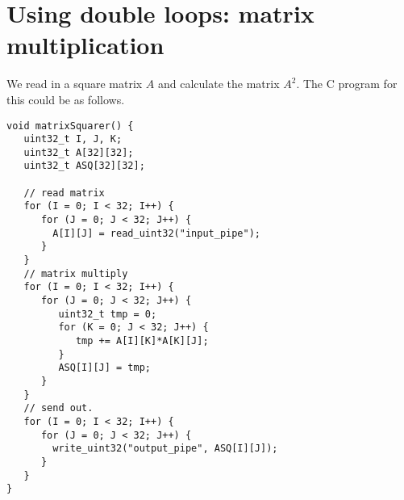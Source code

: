 \documentclass[12pt]{article}
\begin{document}
\section{Using double loops: matrix multiplication}

We read in a square matrix $A$ and calculate the 
matrix $A^2$.  The C program for this could be as follows.
\begin{verbatim}
void matrixSquarer() {
   uint32_t I, J, K;
   uint32_t A[32][32];
   uint32_t ASQ[32][32];

   // read matrix
   for (I = 0; I < 32; I++) {
      for (J = 0; J < 32; J++) {
        A[I][J] = read_uint32("input_pipe");
      }
   }
   // matrix multiply
   for (I = 0; I < 32; I++) {
      for (J = 0; J < 32; J++) {
         uint32_t tmp = 0;
         for (K = 0; J < 32; J++) {
            tmp += A[I][K]*A[K][J];
         }
         ASQ[I][J] = tmp;
      }
   }
   // send out.
   for (I = 0; I < 32; I++) {
      for (J = 0; J < 32; J++) {
        write_uint32("output_pipe", ASQ[I][J]);
      }
   }
}
\end{verbatim}
\end{document}
